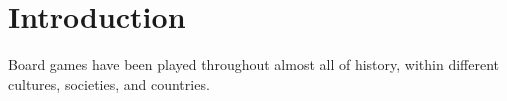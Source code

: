 \chapter{Introduction}
Board games have been played throughout almost all of history, within different cultures, societies, and countries.






